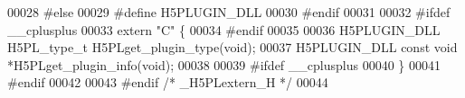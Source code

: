 \begin{DoxyCode}
00028 \textcolor{preprocessor}{#else}
00029 \textcolor{preprocessor}{  #define H5PLUGIN\_DLL}
00030 \textcolor{preprocessor}{#endif}
00031 
00032 \textcolor{preprocessor}{#ifdef \_\_cplusplus}
00033 \textcolor{keyword}{extern} \textcolor{stringliteral}{"C"} \{
00034 \textcolor{preprocessor}{#endif}
00035 
00036 H5PLUGIN\_DLL H5PL\_type\_t H5PLget\_plugin\_type(\textcolor{keywordtype}{void});
00037 H5PLUGIN\_DLL \textcolor{keyword}{const} \textcolor{keywordtype}{void} *H5PLget\_plugin\_info(\textcolor{keywordtype}{void});
00038 
00039 \textcolor{preprocessor}{#ifdef \_\_cplusplus}
00040 \}
00041 \textcolor{preprocessor}{#endif}
00042 
00043 \textcolor{preprocessor}{#endif }\textcolor{comment}{/* \_H5PLextern\_H */}\textcolor{preprocessor}{}
00044 
\end{DoxyCode}

